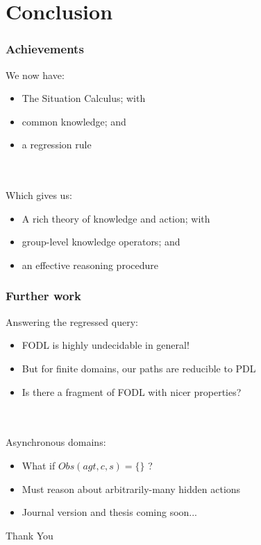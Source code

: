 \documentclass[compress]{beamer}
\begin{document}
\section{Conclusion}

\begin{frame}
\frametitle{Achievements}
We now have:
\begin{itemize}
\item The Situation Calculus; with
\item common knowledge; and
\item a regression rule
\end{itemize}
\ \\
\ \\
\pause
Which gives us:
\begin{itemize}
\item A rich theory of knowledge and action; with
\item group-level knowledge operators; and
\item an effective reasoning procedure
\end{itemize}
\end{frame}


\begin{frame}
\frametitle{Further work}
Answering the regressed query:
\begin{itemize}
\item FODL is highly undecidable in general!
\item But for finite domains, our paths are reducible to PDL
\item Is there a fragment of FODL with nicer properties?
\end{itemize}
\pause
\ \\
\ \\
Asynchronous domains:
\begin{itemize}
\item What if $Obs(agt,c,s) = \{\}$ ?
\item Must reason about arbitrarily-many hidden actions
\pause
\item Journal version and thesis coming soon...
\end{itemize}
\end{frame}

\begin{frame}
\centering \large Thank You\\
\end{frame}
\end{document}
